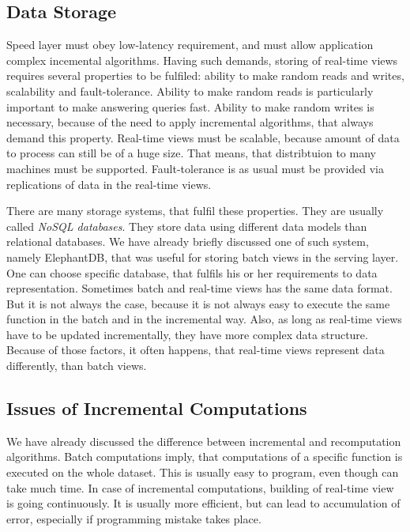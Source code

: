 \subsection{Data Storage}

Speed layer must obey low-latency requirement, and must allow application complex incemental algorithms.
Having such demands, storing of real-time views requires several properties to be fulfiled: ability to make random reads and writes, scalability and fault-tolerance.
Ability to make random reads is particularly important to make answering queries fast.
Ability to make random writes is necessary, because of the need to apply incremental algorithms, that always demand this property.
Real-time views must be scalable, because amount of data to process can still be of a huge size.
That means, that distribtuion to many machines must be supported.
Fault-tolerance is as usual must be provided via replications of data in the real-time views.

There are many storage systems, that fulfil these properties.
They are usually called \textit{NoSQL databases}.
They store data using different data models than relational databases.
We have already briefly discussed one of such system, namely ElephantDB, that was useful for storing batch views in the serving layer.
One can choose specific database, that fulfils his or her requirements to data representation.
Sometimes batch and real-time views has the same data format.
But it is not always the case, because it is not always easy to execute the same function in the batch and in the incremental way.
Also, as long as real-time views have to be updated incrementally, they have more complex data structure.
Because of those factors, it often happens, that real-time views represent data differently, than batch views.

\subsection{Issues of Incremental Computations}

We have already discussed the difference between incremental and recomputation algorithms.
Batch computations imply, that computations of a specific function is executed on the whole dataset.
This is usually easy to program, even though can take much time.
In case of incremental computations, building of real-time view is going continuously.
It is usually more efficient, but can lead to accumulation of error, especially if programming mistake takes place.

